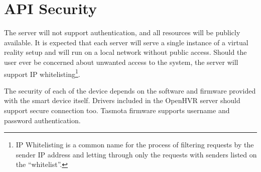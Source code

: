 \hypertarget{x-api-security}{\section{API Security}}
The server will not support authentication, and all resources will be publicly
available. It is expected that each server will serve a single instance of
a virtual reality setup and will run on a local network without public access.
Should the user ever be concerned about unwanted access to the system, the server
will support IP whitelisting\footnote{IP Whitelisting is a common name for the process of filtering requests by the sender IP address and letting through only the requests with senders listed on the ``whitelist''.}.


The security of each of the device depends on the software and firmware provided
with the smart device itself. Drivers included in the OpenHVR server should
support secure connection too. Tasmota firmware supports username and
password authentication.
